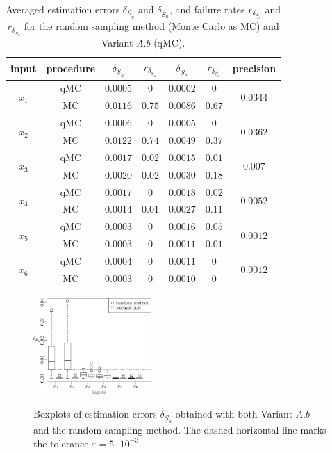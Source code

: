 {\begin{table}[t]
\caption{Averaged estimation errors $\delta_{\underline{S}_u}$ and $\delta_{\overline{S}_u}$, and failure rates $r_{\delta_{\underline{S}_u}}$ and $r_{\delta_{\overline{S}_u}}$ for the random sampling method (Monte Carlo as MC) and Variant $A.b$ (qMC).}
\centering
\begin{tabular}{ccccccc}
\hline
 input & procedure & $\delta_{\underline{S}_u}$ & $r_{\delta_{\underline{S}_u}}$ & $\delta_{\overline{S}_u}$ &$r_{\delta_{\overline{S}_u}}$ & precision \\
\hline
\multirow{2}{*}{$x_1$} & qMC & $0.0005$ & $0$ & $0.0002$ & $0$ & \multirow{2}{*}{$0.0344$} \\
& MC & $0.0116$ & $0.75$ & $0.0086$ & $0.67$ & \\
\hline
\multirow{2}{*}{$x_2$} & qMC & $0.0006$ & $0$ & $0.0005$ & $0$ & \multirow{2}{*}{$0.0362$} \\
& MC & $0.0122$ & $0.74$ & $0.0049$ & $0.37$ & \\
\hline
\multirow{2}{*}{$x_3$} & qMC & $0.0017$ & $0.02$ & $0.0015$ & $0.01$ & \multirow{2}{*}{$0.007$} \\
& MC & $0.0020$ & $0.02$ & $0.0030$ & $0.18$ & \\
\hline
\multirow{2}{*}{$x_4$} & qMC & $0.0017$ & $0$ & $0.0018$ & $0.02$ & \multirow{2}{*}{$0.0052$} \\
& MC & $0.0014$ & $0.01$ & $0.0027$ & $0.11$ & \\
\hline
\multirow{2}{*}{$x_5$} & qMC & $0.0003$ & $0$ & $0.0016$ & $0.05$ & \multirow{2}{*}{$0.0012$} \\
& MC & $0.0003$ & $0$ & $0.0011$ & $0.01$ & \\
\hline
\multirow{2}{*}{$x_6$} & qMC & $0.0004$ & $0$ & $0.0011$ & $0$ & \multirow{2}{*}{$0.0012$} \\
& MC & $0.0003$ & $0$ & $0.0010$ & $0$ & \\
\hline
\end{tabular}
\label{compa_MC}
\end{table}

\begin{figure}[t]
\caption{Boxplots of estimation errors $\delta_{\underline{S}_u}$ obtained with both Variant $A.b$ and the random sampling method. The dashed horizontal line marks the tolerance $\varepsilon=5\cdot 10^{-3}$.}
\centering
\vspace*{0.2cm}
\includegraphics[width=0.4\textwidth]{comp_mc_first.eps}
\label{compa_MC_first}
\end{figure}

}
